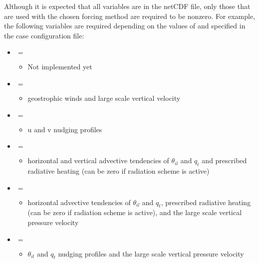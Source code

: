 Although it is expected that all variables are in the netCDF file, only those that are used with the chosen forcing method are required to be nonzero. For example, the following variables are required depending on the values of  and  specified in the case configuration file:

\begin{itemize}
\item {} $=$ 
	\begin{itemize}
		\item Not implemented yet
	\end{itemize}
\item {} $=$ 
	\begin{itemize}
		\item geostrophic winds and large scale vertical velocity
	\end{itemize}
\item {} $=$ 
	\begin{itemize}
		\item u and v nudging profiles
	\end{itemize}
\item {} $=$ 
	\begin{itemize}
		\item horizontal and vertical advective tendencies of $\theta_{il}$ and $q_t$ and prescribed radiative heating (can be zero if radiation scheme is active)
	\end{itemize}
\item {} $=$ 
	\begin{itemize}
		\item horizontal advective tendencies of $\theta_{il}$ and $q_t$, prescribed radiative heating (can be zero if radiation scheme is active), and the large scale vertical pressure velocity
	\end{itemize}
\item {} $=$ 
	\begin{itemize}
		\item $\theta_{il}$ and $q_t$ nudging profiles and the large scale vertical pressure velocity
	\end{itemize}
\end{itemize}

